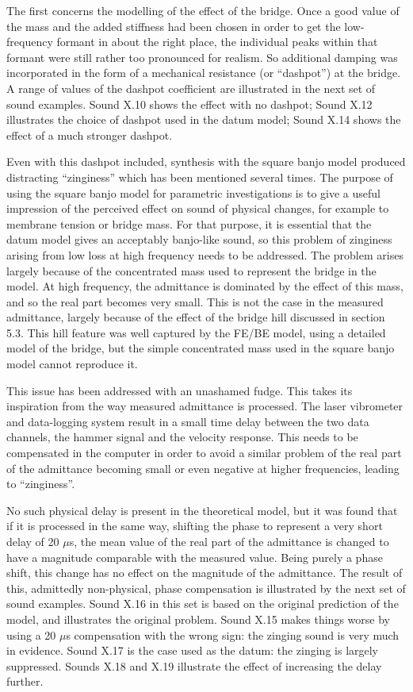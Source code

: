   The first concerns the modelling of the effect of the bridge. Once a good 
  value of the mass and the added stiffness had been chosen in order to get the 
  low-frequency formant in about the right place, the individual peaks within 
  that formant were still rather too pronounced for realism. So additional 
  damping was incorporated in the form of a mechanical resistance (or 
  ``dashpot'') at the bridge. A range of values of the dashpot coefficient are 
  illustrated in the next set of sound examples. Sound X.10 shows the effect 
  with no dashpot; Sound X.12 illustrates the choice of dashpot used in the 
  datum model; Sound X.14 shows the effect of a much stronger dashpot. 

  Even with this dashpot included, synthesis with the square banjo model 
  produced distracting ``zinginess'' which has been mentioned several times. 
  The purpose of using the square banjo model for parametric investigations is 
  to give a useful impression of the perceived effect on sound of physical 
  changes, for example to membrane tension or bridge mass. For that purpose, it 
  is essential that the datum model gives an acceptably banjo-like sound, so 
  this problem of zinginess arising from low loss at high frequency needs to be 
  addressed. The problem arises largely because of the concentrated mass used 
  to represent the bridge in the model. At high frequency, the admittance is 
  dominated by the effect of this mass, and so the real part becomes very 
  small. This is not the case in the measured admittance, largely because of 
  the effect of the bridge hill discussed in section 5.3. This hill feature was 
  well captured by the FE/BE model, using a detailed model of the bridge, but 
  the simple concentrated mass used in the square banjo model cannot reproduce 
  it. 

  This issue has been addressed with an unashamed fudge. This takes its 
  inspiration from the way measured admittance is processed. The laser 
  vibrometer and data-logging system result in a small time delay between the 
  two data channels, the hammer signal and the velocity response. This needs to 
  be compensated in the computer in order to avoid a similar problem of the 
  real part of the admittance becoming small or even negative at higher 
  frequencies, leading to ``zinginess''. 

  No such physical delay is present in the theoretical model, but it was found 
  that if it is processed in the same way, shifting the phase to represent a 
  very short delay of 20 $\mu$s, the mean value of the real part of the 
  admittance is changed to have a magnitude comparable with the measured value. 
  Being purely a phase shift, this change has no effect on the magnitude of the 
  admittance. The result of this, admittedly non-physical, phase compensation 
  is illustrated by the next set of sound examples. Sound X.16 in this set is 
  based on the original prediction of the model, and illustrates the original 
  problem. Sound X.15 makes things worse by using a 20 $\mu$s compensation with 
  the wrong sign: the zinging sound is very much in evidence. Sound X.17 is the 
  case used as the datum: the zinging is largely suppressed. Sounds X.18 and 
  X.19 illustrate the effect of increasing the delay further. 

